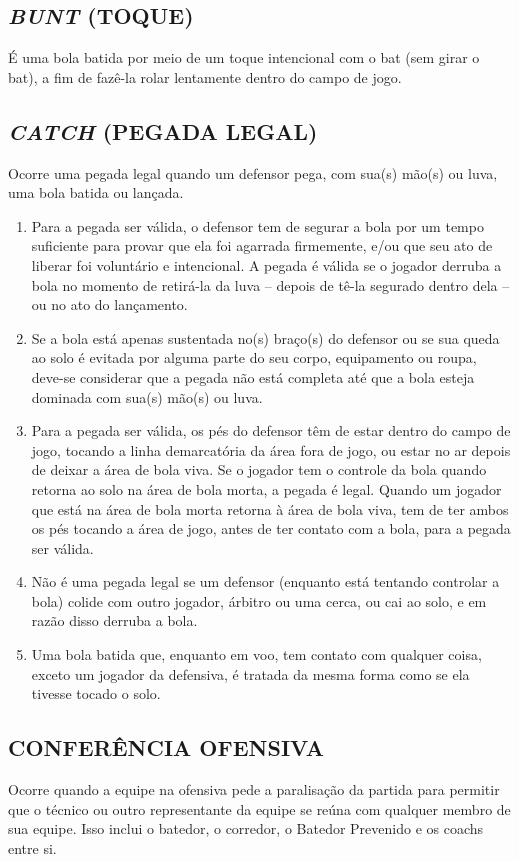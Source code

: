 \subsection{\textit{BUNT} (TOQUE)}
 É uma bola batida por meio de um toque intencional com o \gls{bat} (sem girar o \gls{bat}), a fim de fazê-la rolar lentamente dentro do campo de jogo.
\subsection{\textit{CATCH} (PEGADA LEGAL)}
 Ocorre uma pegada legal quando um defensor pega, com sua(s) mão(s) ou luva, uma bola batida ou lançada.
\begin{enumerate}[label=(\alph*)]
	\item   Para a pegada ser válida, o defensor tem de segurar a bola por um tempo suficiente para provar que ela foi agarrada firmemente, e/ou que seu ato de liberar foi voluntário e intencional. A pegada é válida se o jogador derruba a bola  no momento de retirá-la da luva -- depois de tê-la segurado dentro dela -- ou no ato do lançamento.

	\item  Se a bola está apenas sustentada no(s) braço(s) do defensor ou se sua queda ao solo é evitada por alguma parte do seu corpo, equipamento ou roupa, deve-se considerar que a pegada não está completa até que a bola esteja dominada  com sua(s) mão(s) ou luva.
	\item  Para a pegada ser válida, os pés do defensor têm de estar dentro do campo de jogo, tocando a linha demarcatória da área fora de jogo, ou estar no ar depois de deixar a área de bola viva. Se o jogador tem o controle da bola quando retorna ao solo na área de bola morta, a pegada é legal. Quando um jogador que está	 na área de bola morta retorna à área de bola viva, tem de ter ambos os pés	 tocando a área de jogo, antes de ter contato com a bola, para a pegada ser	 válida.
	\item  Não é uma pegada legal se um defensor (enquanto está tentando controlar a bola) colide com outro jogador, árbitro ou uma cerca, ou cai ao solo, e em razão disso derruba a bola.
	\item  Uma bola batida que, enquanto em voo, tem contato com qualquer coisa, exceto um jogador da defensiva, é tratada da mesma forma como se ela tivesse tocado o solo.
\end{enumerate}
\subsection{CONFERÊNCIA OFENSIVA}
 Ocorre quando a equipe na ofensiva pede a paralisação da partida para permitir que o técnico ou outro representante da equipe se reúna com qualquer membro de sua equipe. Isso inclui o batedor, o corredor, o Batedor Prevenido e os \glspl{coach} entre si.

